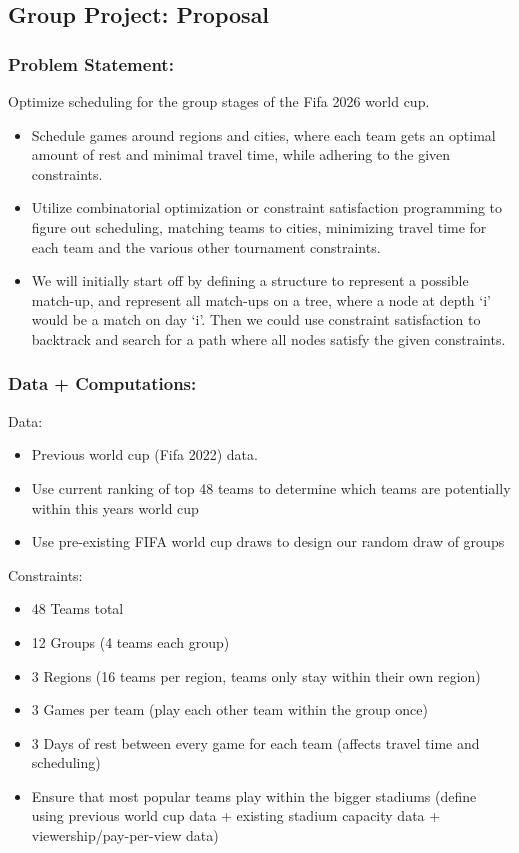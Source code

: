 \documentclass[letterpaper,12pt]{article}
\begin{document}
\subsection*{Group Project: Proposal}
\medskip

\subsubsection*{Problem Statement: } Optimize scheduling for the group stages of the Fifa 2026 world cup.
\begin{itemize}
\item Schedule games around regions and cities, where each team gets an optimal amount of rest and minimal travel time, while adhering to the given constraints.

\item Utilize combinatorial optimization or constraint satisfaction programming to figure out scheduling, matching teams to cities, minimizing travel time for each team and the various other tournament constraints.

\item We will initially start off by defining a structure to represent a possible match-up, and represent all match-ups on a tree, where a node at depth ‘i’ would be a match on day ‘i’. Then we could use constraint satisfaction to backtrack and search for a path where all nodes satisfy the given constraints.
\end{itemize}

\subsubsection*{Data + Computations: } 
Data: 
\begin{itemize}
\itemsep0em 
\item Previous world cup (Fifa 2022) data.
\item Use current ranking of top 48 teams to determine which teams are potentially within this years world cup
\item Use pre-existing FIFA world cup draws to design our random draw of groups
\end{itemize}
Constraints:
\begin{itemize}
\itemsep0em 
\item 48 Teams total
\item 12 Groups (4 teams each group)
\item 3 Regions (16 teams per region, teams only stay within their own region)
\item 3 Games per team (play each other team within the group once)
\item 3 Days of rest between every game for each team (affects travel time and scheduling)
\item Ensure that most popular teams play within the bigger stadiums (define using previous world cup data + existing stadium capacity data + viewership/pay-per-view data)
\end{itemize}
\end{document}
